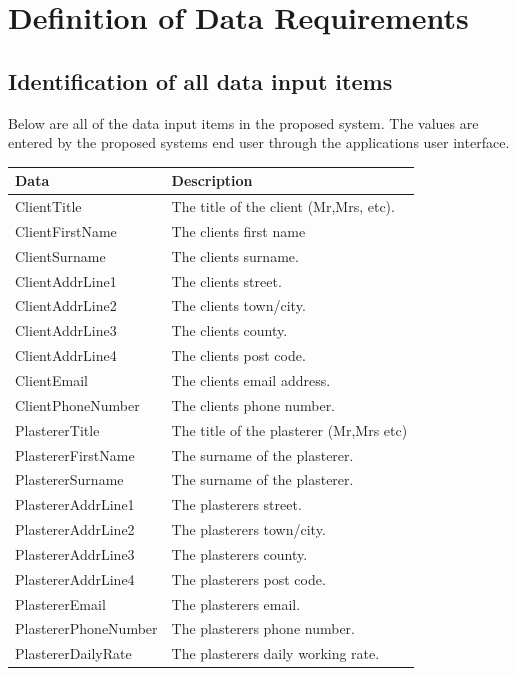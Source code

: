 \pagebreak
\section{Definition of Data Requirements}

\subsection{Identification of all data input items}

\begin{flushleft}
Below are all of the data input items in the proposed system. The values are entered by the proposed systems end user through 
the applications user interface.

\end{flushleft}


\begin{flushleft}

\begin{longtable}{|p{3.5cm}|p{5cm}|} \hline
\textbf{Data} & \textbf{Description} \\ \hline
ClientTitle & The title of the client (Mr,Mrs, etc). \\ \hline
ClientFirstName & The clients first name \\ \hline
ClientSurname & The clients surname. \\ \hline
ClientAddrLine1 & The clients street. \\ \hline
ClientAddrLine2 & The clients town/city. \\ \hline
ClientAddrLine3 & The clients county. \\ \hline
ClientAddrLine4 & The clients post code. \\ \hline
ClientEmail & The clients email address. \\ \hline
ClientPhoneNumber & The clients phone number. \\ \hline \hline

PlastererTitle & The title of the plasterer (Mr,Mrs etc) \\ \hline
PlastererFirstName & The surname of the plasterer. \\ \hline
PlastererSurname & The surname of the plasterer. \\ \hline
PlastererAddrLine1 & The plasterers street. \\ \hline
PlastererAddrLine2 & The plasterers town/city. \\ \hline
PlastererAddrLine3 & The plasterers county. \\ \hline
PlastererAddrLine4 & The plasterers post code. \\ \hline
PlastererEmail & The plasterers email. \\ \hline
PlastererPhoneNumber & The plasterers phone number. \\ \hline
PlastererDailyRate & The plasterers daily working rate. \\ \hline \hline



\end{longtable}
\end{flushleft}
